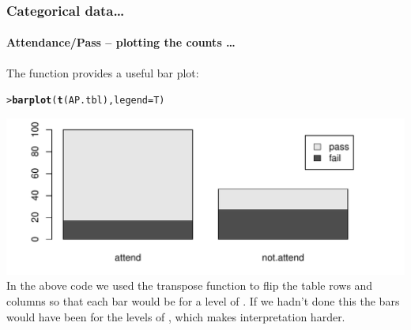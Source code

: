 \documentclass{beamer}\usepackage[]{graphicx}\usepackage[]{xcolor}
\makeatletter
\def\maxwidth{ %
  \ifdim\Gin@nat@width>\linewidth
    \linewidth
  \else
    \Gin@nat@width
  \fi
}
\newcommand{\hlstd}[1]{\textcolor[rgb]{0.345,0.345,0.345}{#1}}%
\newcommand{\hlkwc}[1]{\textcolor[rgb]{0.333,0.667,0.333}{#1}}%
\newcommand{\hlkwd}[1]{\textcolor[rgb]{0.737,0.353,0.396}{\textbf{#1}}}%
\newenvironment{kframe}{%
 \def\at@end@of@kframe{}%
 \ifinner\ifhmode%
  \def\at@end@of@kframe{\end{minipage}}%
  \begin{minipage}{\columnwidth}%
 \fi\fi%
 \def\FrameCommand##1{\hskip\@totalleftmargin \hskip-\fboxsep
 \colorbox{shadecolor}{##1}\hskip-\fboxsep
     \hskip-\linewidth \hskip-\@totalleftmargin \hskip\columnwidth}%
 \MakeFramed {\advance\hsize-\width
   \@totalleftmargin\z@ \linewidth\hsize
   \@setminipage}}%
 {\par\unskip\endMakeFramed%
 \at@end@of@kframe}
\newenvironment{knitrout}{}{} %
\makeatother
\begin{document}
\begin{frame}[fragile]
\frametitle{Categorical data\ldots}
\framesubtitle{Attendance/Pass -- plotting the counts \ldots}
The  function provides a useful bar plot:
\medskip

\begin{knitrout}\scriptsize
{}\color{fgcolor}\begin{kframe}
\begin{alltt}
\hlstd{> }\hlkwd{barplot}\hlstd{(}\hlkwd{t}\hlstd{(AP.tbl),}\hlkwc{legend}\hlstd{=T)}
\end{alltt}
\end{kframe}
\includegraphics[width=\maxwidth]{figure/RC-H16-002c-1} 
\end{knitrout}
In the above code we used the transpose function  to flip the table rows and columns so that each bar would be for a level of . If we hadn't done this the bars would have been for the levels of , which makes interpretation harder.
\end{frame}
\end{document}
